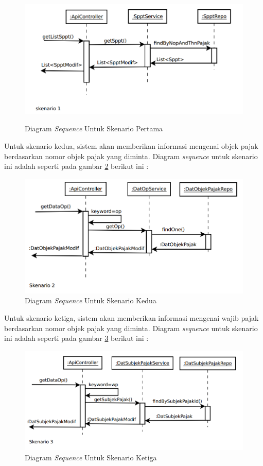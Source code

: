 \documentclass[pdftex,12pt, oneside]{article}
\begin{document}
\begin{figure}[H]
	\centering
	\includegraphics[width=1\textwidth]{./resources/seq-dia-1}
	\label{fig:seq-dia-1}
	\caption{Diagram \textit{Sequence} Untuk Skenario Pertama}
\end{figure}

Untuk skenario kedua, sistem akan memberikan informasi mengenai objek pajak berdasarkan nomor objek pajak yang diminta. Diagram \textit{sequence} untuk skenario ini adalah seperti pada gambar \ref{fig:seq-dia-2} berikut ini :

\begin{figure}[H]
	\centering
	\includegraphics[width=1\textwidth]{./resources/seq-dia-2}
	\caption{Diagram \textit{Sequence} Untuk Skenario Kedua} 
	\label{fig:seq-dia-2}
\end{figure}

Untuk skenario ketiga, sistem akan memberikan informasi mengenai wajib pajak berdasarkan nomor objek pajak yang diminta. Diagram \textit{sequence} untuk skenario ini adalah seperti pada gambar \ref{fig:seq-dia-3} berikut ini :

\begin{figure}[H]
	\centering
	\includegraphics[width=1\textwidth]{./resources/seq-dia-3}
	\caption{Diagram \textit{Sequence} Untuk Skenario Ketiga}
	\label{fig:seq-dia-3}
\end{figure}
\end{document}
